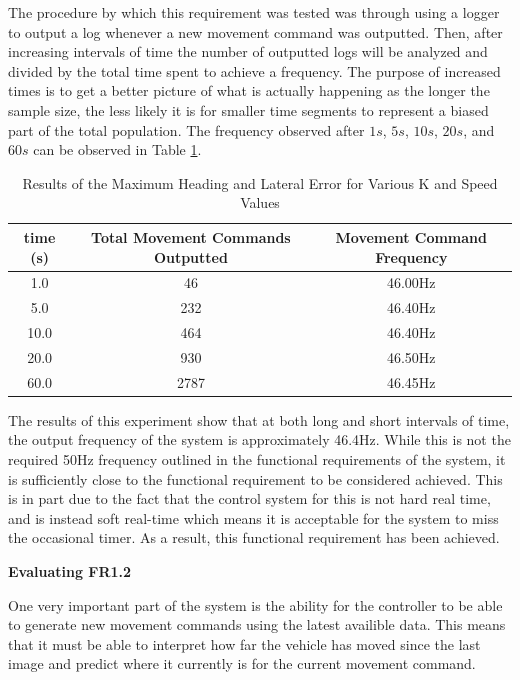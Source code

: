 \documentclass[titlepage,draft]{article}
\begin{document}
{The procedure by which this requirement was tested was through using a logger to output a log whenever a new movement command was outputted. Then, after increasing intervals of time the number of outputted logs will be analyzed and divided by the total time spent to achieve a frequency. The purpose of increased times is to get a better picture of what is actually happening as the longer the sample size, the less likely it is for smaller time segments to represent a biased part of the total population. The frequency observed after \(1s\), \(5s\), \(10s\), \(20s\), and \(60s\) can be observed in Table \ref{tab:frequency}.

\begin{table}
	\centering
	\begin{tabular}{| c | c | c |}
		\hline
		time (s) & Total Movement Commands Outputted & Movement Command Frequency \\ [0.5ex]
		\hline
		1.0      & 46                                & 46.00Hz                    \\
		\hline
		5.0      & 232                               & 46.40Hz                    \\
		\hline
		10.0     & 464                               & 46.40Hz                    \\
		\hline
		20.0     & 930                               & 46.50Hz                    \\
		\hline
		60.0     & 2787                              & 46.45Hz                    \\
		\hline
	\end{tabular}
	\caption{Results of the Maximum Heading and Lateral Error for Various K and Speed Values}
	\label{tab:frequency}
\end{table}


The results of this experiment show that at both long and short intervals of time, the output frequency of the system is approximately 46.4Hz. While this is not the required 50Hz frequency outlined in the functional requirements of the system, it is sufficiently close to the functional requirement to be considered achieved. This is in part due to the fact that the control system for this is not hard real time, and is instead soft real-time which means it is acceptable for the system to miss the occasional timer. As a result, this functional requirement has been achieved.

\textbf{Evaluating FR1.2}

One very important part of the system is the ability for the controller to be able to generate new movement commands using the latest availible data. This means that it must be able to interpret how far the vehicle has moved since the last image and predict where it currently is for the current movement command.

}
\end{document}
